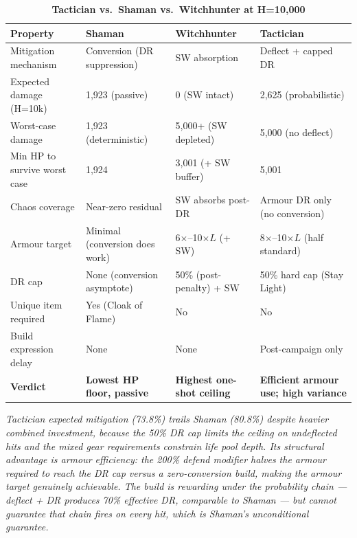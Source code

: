 \documentclass[12pt, letterpaper]{article}
\begin{document}
\begin{table}[htbp]
\centering
\caption{\textbf{Tactician vs.\ Shaman vs.\ Witchhunter at H=10{,}000}}
{\small
\begin{tabular}{llll}
\toprule
\textbf{Property} & \textbf{Shaman} & \textbf{Witchhunter} & \textbf{Tactician} \\
\midrule
\rowcolor{rowalt} Mitigation mechanism & Conversion (DR suppression) & SW absorption & Deflect + capped DR \\
Expected damage (H=10k) & 1{,}923 (passive) & 0 (SW intact) & 2{,}625 (probabilistic) \\
\rowcolor{rowalt} Worst-case damage & 1{,}923 (deterministic) & 5{,}000+ (SW depleted) & 5{,}000 (no deflect) \\
Min HP to survive worst case & 1{,}924 & 3{,}001 (+ SW buffer) & 5{,}001 \\
\rowcolor{rowalt} Chaos coverage & Near-zero residual & SW absorbs post-DR & Armour DR only (no conversion) \\
Armour target & Minimal (conversion does work) & 6$\times$--10$\times L$ (+ SW) & 8$\times$--10$\times L$ (half standard) \\
\rowcolor{rowalt} DR cap & None (conversion asymptote) & 50\% (post-penalty) + SW & 50\% hard cap (Stay Light) \\
Unique item required & Yes (Cloak of Flame) & No & No \\
\rowcolor{rowalt} Build expression delay & None & None & Post-campaign only \\
\rowcolor{rowhi} \textbf{Verdict} & \textbf{Lowest HP floor, passive} & \textbf{Highest one-shot ceiling} & \textbf{Efficient armour use; high variance} \\
\bottomrule
\end{tabular}
}
\smallskip
\begin{minipage}{\linewidth}
\small\textit{Tactician expected mitigation (73.8\%) trails Shaman (80.8\%) despite heavier combined investment, because the 50\% DR cap limits the ceiling on undeflected hits and the mixed gear requirements constrain life pool depth. Its structural advantage is armour efficiency: the 200\% defend modifier halves the armour required to reach the DR cap versus a zero-conversion build, making the armour target genuinely achievable. The build is rewarding under the probability chain --- deflect + DR produces 70\% effective DR, comparable to Shaman --- but cannot guarantee that chain fires on every hit, which is Shaman's unconditional guarantee.}
\end{minipage}
\end{table}
\end{document}
